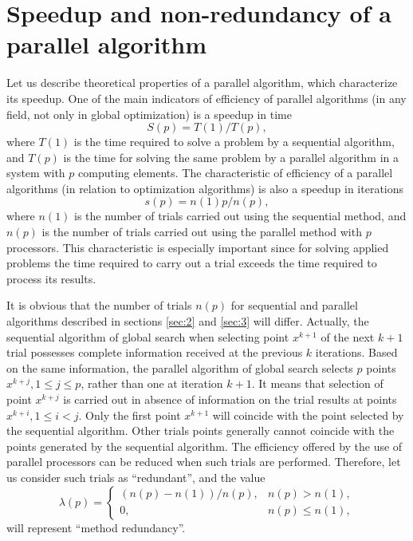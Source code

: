 \documentclass[smallcondensed]{svjour3}     %
\begin{document}
\section{Speedup and non-redundancy of a parallel algorithm} \label{sec:4}

Let us describe theoretical properties of a parallel algorithm, which characterize its speedup. One of the main indicators of efficiency of parallel algorithms (in any field, not only in global optimization) is a speedup in time
\[
S(p)=T(1)/T(p),
\]
where $T(1)$ is the time required to solve a problem by a sequential algorithm, and $T(p)$ is the time for solving the same problem by a parallel algorithm in a system with $p$ computing elements. The characteristic of efficiency of a parallel algorithms (in relation to optimization algorithms) is also a speedup in iterations
\begin{equation}\label{eq:26}
s(p)=n(1)p/n(p),
\end{equation}
where $n(1)$ is the number of trials carried out using the sequential method, and $n(p)$ is the number of trials carried out using the parallel method with $p$ processors. This characteristic is especially important since for solving applied problems the time required to carry out a trial exceeds the time required to process its results.

It is obvious that the number of trials $n(p)$ for sequential and parallel algorithms described in sections \ref{sec:2} and \ref{sec:3} will differ. Actually, the sequential algorithm of global search when selecting point $x^{k+1}$ of the next $k+1$ trial possesses complete information received at the previous $k$ iterations. Based on the same information, the parallel algorithm of global search selects $p$ points $x^{k+j}, 1\leq j \leq p$, rather than one at iteration $k+1$. It means that selection of point $x^{k+j}$ is carried out in absence of information on the trial results at points $x^{k+i}, 1\leq i<j$. Only the first point $x^{k+1}$ will coincide with the point selected by the sequential algorithm. Other trials points generally cannot coincide with the points generated by the sequential algorithm. The efficiency offered by the use of parallel processors can be reduced when such trials are performed. Therefore, let us consider such trials as ``redundant'', and the value 
\[
\lambda(p) = \left\{
   \begin{array}{lr}
     (n(p)-n(1))/n(p), & n(p) > n(1),\\
     0, & n(p)\leq n(1),
   \end{array}
\right.
\]
will represent ``method redundancy''.
\end{document}
